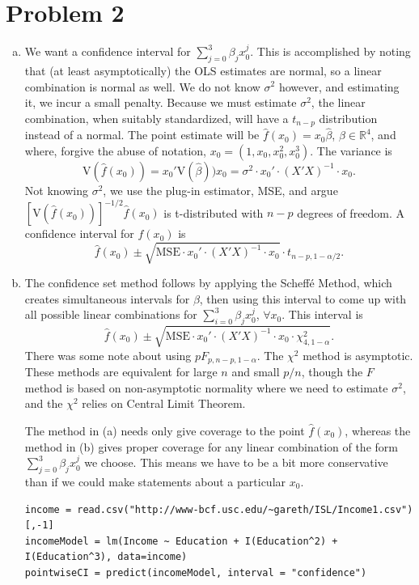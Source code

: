 \documentclass[12pt]{article}
\begin{document}
\section*{Problem 2}
\begin{enumerate}[(a)]
\item We want a confidence interval for $\sum_{j=0}^3 \beta_j x_0^j$. This is accomplished by noting that (at least asymptotically) the OLS estimates are normal, so a linear combination is normal as well. We do not know $\sigma^2$ however, and estimating it, we incur a small penalty. Because we must estimate $\sigma^2$, the linear combination, when suitably standardized, will have a $t_{n-p}$ distribution instead of a normal. The point estimate will be $\hat{f}(x_0) =  x_0 \hat{\beta}$, $\beta \in \mathbb{R}^4$, and where, forgive the abuse of notation, $x_0 = (1, x_0, x_0^2, x_0^3)$. The variance is
$$ \text{V}(\hat{f}(x_0)) = x_0' \text{V}( \hat{\beta}) ) x_0 = \sigma^2 \cdot x_0' \cdot (X'X)^{-1} \cdot x_0. $$
Not knowing $\sigma^2$, we use the plug-in estimator, MSE, and argue $\left[ \text{V}(\hat{f}(x_0))\right]^{-1/2} \hat{f}(x_0)$ is t-distributed with $n-p$ degrees of freedom. A confidence interval for $f(x_0)$ is 
$$\hat{f}(x_0) \pm \sqrt{\text{MSE} \cdot x_0' \cdot (X'X)^{-1} \cdot x_0} \cdot t_{n-p, 1-\alpha/2}.$$
\item The confidence set method follows by applying the Scheff\'{e} Method, which creates simultaneous intervals for $\beta$, then using this interval to come up with all possible linear combinations for $\sum_{i=0}^3 \beta_j x_0^j$, $\forall x_0$. This interval is 
$$\hat{f}(x_0) \pm \sqrt{\text{MSE} \cdot x_0' \cdot (X'X)^{-1} \cdot x_0 \cdot \chi_{4, 1-\alpha}^2}.$$
There was some note about using $p F_{p, n-p, 1-\alpha}$. The $\chi^2$ method is asymptotic. These methods are equivalent for large $n$ and small $p/n$, though the $F$ method is based on non-asymptotic normality where we need to estimate $\sigma^2$, and the $\chi^2$ relies on Central Limit Theorem.

The method in (a) needs only give coverage to the point $\hat{f}(x_0)$, whereas the method in (b) gives proper coverage for any linear combination of the form $\sum_{j=0}^3 \beta_j x_0^j$ we choose. This means we have to be a bit more conservative than if we could make statements about a particular $x_0$.
\begin{lstlisting}
income = read.csv("http://www-bcf.usc.edu/~gareth/ISL/Income1.csv")[,-1]
incomeModel = lm(Income ~ Education + I(Education^2) + I(Education^3), data=income)
pointwiseCI = predict(incomeModel, interval = "confidence")


\end{lstlisting}
\end{enumerate}
\end{document}
